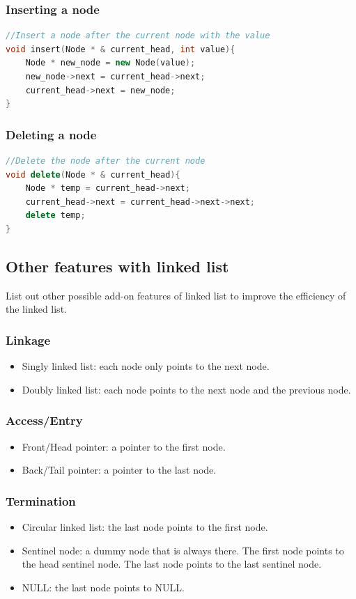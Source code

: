 \documentclass[letterpaper,12pt]{article}
\begin{document}
\subsubsection{Inserting a node}
\begin{lstlisting}[language=C++]
//Insert a node after the current node with the value
void insert(Node * & current_head, int value){
    Node * new_node = new Node(value);
    new_node->next = current_head->next;
    current_head->next = new_node;
}
\end{lstlisting}
\subsubsection{Deleting a node}
\begin{lstlisting}[language=C++]
//Delete the node after the current node
void delete(Node * & current_head){
    Node * temp = current_head->next;
    current_head->next = current_head->next->next;
    delete temp;
}
\end{lstlisting}
\subsection{Other features with linked list}
List out other possible add-on features of linked list to improve the efficiency of the linked list.
\subsubsection{Linkage}
\begin{itemize}
    \item Singly linked list: each node only points to the next node.
    \item Doubly linked list: each node points to the next node and the previous node.
\end{itemize}
\subsubsection{Access/Entry}
\begin{itemize}
    \item Front/Head pointer: a pointer to the first node.
    \item Back/Tail pointer: a pointer to the last node.
\end{itemize}
\subsubsection{Termination}
\begin{itemize}
    \item Circular linked list: the last node points to the first node.
    \item Sentinel node: a dummy node that is always there. The first node points to the head sentinel node. The last node points to the last sentinel node.
    \item NULL: the last node points to NULL.
\end{itemize}
\end{document}
